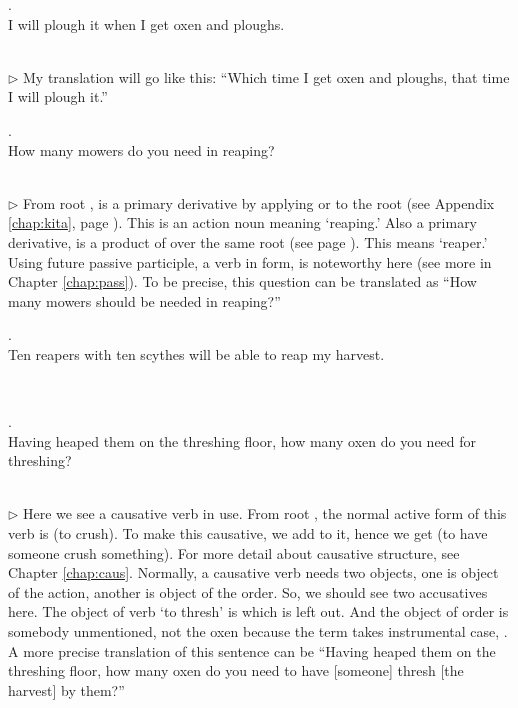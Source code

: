 \medskip
\parbox[lt]{0.93\linewidth}{\raggedright{}. \\
\hspace*{6mm}I will plough it when I get oxen and ploughs.}\\[1mm]
{\small $\triangleright$ My translation will go like this: ``Which time I get oxen and ploughs, that time I will plough it.''}

\medskip
\parbox[lt]{0.93\linewidth}{\raggedright{}. \\
\hspace*{6mm}How many mowers do you need in reaping?}\\[1mm]
{\small $\triangleright$ From root ,  is a primary derivative by applying  or  to the root (see Appendix \ref{chap:kita}, page \pageref{pacck4:yu}). This is an action noun meaning `reaping.' Also a primary derivative,  is a product of  over the same root (see page \pageref{pacckx:ka2}). This means `reaper.' Using future passive participle, a verb in  form, is noteworthy here (see more in Chapter \ref{chap:pass}). To be precise, this question can be translated as ``How many mowers should be needed in reaping?''}

\medskip
\parbox[lt]{0.93\linewidth}{\raggedright{}. \\
\hspace*{6mm}Ten reapers with ten scythes will be able to reap my harvest.}\\[1mm]

\medskip
\parbox[lt]{0.93\linewidth}{\raggedright{}. \\
\hspace*{6mm}Having heaped them on the threshing floor, how many oxen do you need for threshing?}\\[1mm]
{\small $\triangleright$ Here we see a causative verb in use. From root , the normal active form of this verb is  (to crush). To make this causative, we add  to it, hence we get  (to have someone crush something). For more detail about causative structure, see Chapter \ref{chap:caus}. Normally, a causative verb needs two objects, one is object of the action, another is object of the order. So, we should see two accusatives here. The object of verb `to thresh' is  which is left out. And the object of order is somebody unmentioned, not the oxen because the term takes instrumental case, . A more precise translation of this sentence can be ``Having heaped them on the threshing floor, how many oxen do you need to have [someone] thresh [the harvest] by them?''}

